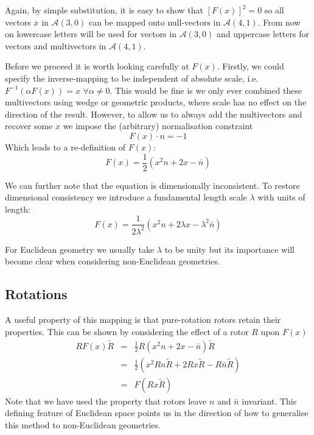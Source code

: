 Again, by simple substitution, it is easy to show that $[F(x)]^2 = 0$ so all vectors
$x$ in $\mathcal{A}(3,0)$ can be mapped onto null-vectors in $\mathcal{A}(4,1)$.
From now on lowercase letters will be used for vectors in $\mathcal{A}(3,0)$ and
uppercase letters for vectors and multivectors in $\mathcal{A}(4,1)$.

Before we proceed it is worth looking carefully at $F(x)$. Firstly,
we could specify the inverse-mapping to be independent of absolute
scale, i.e. $F^{-1}(\alpha F(x)) = x$ $\forall \alpha \ne 0$.
This would be fine is we only ever combined these multivectors using
wedge or geometric products, where scale has no effect on the direction
of the result. However, to allow us to always add the multivectors and
recover some $x$ we impose the (arbitrary) normalisation constraint
\[
F(x) \cdot n = -1
\]
Which leads to a re-definition of $F(x)$:
\begin{displaymath}
F(x) = \frac{1}{2}(x^2n + 2x - \bar{n})
\end{displaymath}

We can further note that the equation is dimensionally inconsistent. To
restore dimensional consistency we introduce a fundamental length scale
$\lambda$ with units of length:
\begin{displaymath}
F(x) = \frac{1}{2\lambda^2}(x^2n + 2\lambda x - \lambda^2 \bar{n})
\end{displaymath}

For Euclidean geometry we usually take $\lambda$ to be unity but its
importance will become clear when considering non-Euclidean geometries.

\subsection{Rotations}

A useful property of this mapping is that pure-rotation rotors 
retain their properties.
This can be shown by considering the effect of a rotor $R$ upon $F(x)$
\begin{eqnarray*}
RF(x)\tilde{R} & = & \frac{1}{2}R(x^2n + 2x - \bar{n}) \tilde{R}\\
& = & \frac{1}{2}\left(x^2Rn\tilde{R} + 2Rx\tilde{R} - R\bar{n}\tilde{R}\right) \\
& = & F(Rx\tilde{R})
\end{eqnarray*}
Note that we have used the property that rotors leave $n$ and $\bar{n}$
invariant.
This defining feature of Euclidean space points us in the direction
of how to generalise this method to non-Euclidean geometries.

